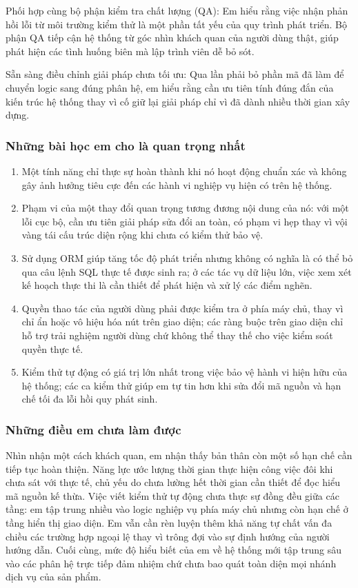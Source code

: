 Phối hợp cùng bộ phận kiểm tra chất lượng (QA): Em hiểu rằng việc nhận phản hồi lỗi từ môi trường kiểm thử là một phần tất yếu của quy trình phát triển. Bộ phận QA tiếp cận hệ thống từ góc nhìn khách quan của người dùng thật, giúp phát hiện các tình huống biên mà lập trình viên dễ bỏ sót.

Sẵn sàng điều chỉnh giải pháp chưa tối ưu: Qua lần phải bỏ phần mã đã làm để chuyển logic sang đúng phân hệ, em hiểu rằng cần ưu tiên tính đúng đắn của kiến trúc hệ thống thay vì cố giữ lại giải pháp chỉ vì đã dành nhiều thời gian xây dựng.

\subsubsection{Những bài học em cho là quan trọng nhất}

\begin{enumerate}[leftmargin=1.2cm, itemsep=2pt, topsep=2pt]
\item Một tính năng chỉ thực sự hoàn thành khi nó hoạt động chuẩn xác và không gây ảnh hưởng tiêu cực đến các hành vi nghiệp vụ hiện có trên hệ thống.
\item Phạm vi của một thay đổi quan trọng tương đương nội dung của nó: với một lỗi cục bộ, cần ưu tiên giải pháp sửa đổi an toàn, có phạm vi hẹp thay vì vội vàng tái cấu trúc diện rộng khi chưa có kiểm thử bảo vệ.
\item Sử dụng ORM giúp tăng tốc độ phát triển nhưng không có nghĩa là có thể bỏ qua câu lệnh SQL thực tế được sinh ra; ở các tác vụ dữ liệu lớn, việc xem xét kế hoạch thực thi là cần thiết để phát hiện và xử lý các điểm nghẽn.
\item Quyền thao tác của người dùng phải được kiểm tra ở phía máy chủ, thay vì chỉ ẩn hoặc vô hiệu hóa nút trên giao diện; các ràng buộc trên giao diện chỉ hỗ trợ trải nghiệm người dùng chứ không thể thay thế cho việc kiểm soát quyền thực tế.
\item Kiểm thử tự động có giá trị lớn nhất trong việc bảo vệ hành vi hiện hữu của hệ thống; các ca kiểm thử giúp em tự tin hơn khi sửa đổi mã nguồn và hạn chế tối đa lỗi hồi quy phát sinh.
\end{enumerate}

\subsubsection{Những điều em chưa làm được}

Nhìn nhận một cách khách quan, em nhận thấy bản thân còn một số hạn chế cần tiếp tục hoàn thiện. Năng lực ước lượng thời gian thực hiện công việc đôi khi chưa sát với thực tế, chủ yếu do chưa lường hết thời gian cần thiết để đọc hiểu mã nguồn kế thừa. Việc viết kiểm thử tự động chưa thực sự đồng đều giữa các tầng: em tập trung nhiều vào logic nghiệp vụ phía máy chủ nhưng còn hạn chế ở tầng hiển thị giao diện. Em vẫn cần rèn luyện thêm khả năng tự chất vấn đa chiều các trường hợp ngoại lệ thay vì trông đợi vào sự định hướng của người hướng dẫn. Cuối cùng, mức độ hiểu biết của em về hệ thống mới tập trung sâu vào các phân hệ trực tiếp đảm nhiệm chứ chưa bao quát toàn diện mọi nhánh dịch vụ của sản phẩm.

